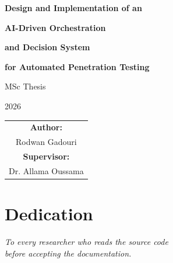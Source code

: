 \documentclass[12pt, a4paper, oneside, openany]{book}
\begin{document}

\frontmatter
{}

\thispagestyle{empty}
\begin{titlepage}
\begin{center}
\vspace*{2cm}
{\Huge\bfseries Design and Implementation of an\par}
\vspace{0.5cm}
{\Huge\bfseries AI-Driven Orchestration\par}
\vspace{0.5cm}
{\Huge\bfseries and Decision System\par}
\vspace{2cm}
{\LARGE\bfseries for Automated Penetration Testing\par}
\vspace{3cm}
{\Large MSc Thesis\par}
\vspace{1cm}
{\Large 2026\par}
\vspace{3cm}
\begin{tabular}{c}
{\Large\bfseries Author:} \\[0.3cm]
{\Large Rodwan Gadouri} \\[1cm]
{\Large\bfseries Supervisor:} \\[0.3cm]
{\Large Dr. Allama Oussama}
\end{tabular}
\vfill
\end{center}
\end{titlepage}

\cleardoublepage

\chapter*{Dedication}

\vspace{1.5cm}
\begin{center}
\textit{To every researcher who reads the source code\\[4pt]
before accepting the documentation.}
\end{center}

\cleardoublepage

\end{document}
